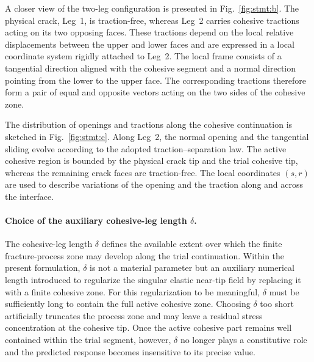 \documentclass[smallextended]{svjour3}       %
\begin{document}
A closer view of the two-leg configuration is presented in
Fig.~\ref{fig:stmt:b}. The physical crack, Leg~1, is traction-free, whereas
Leg~2 carries cohesive tractions acting on its two opposing faces. These
tractions depend on the local relative displacements between the upper and
lower faces and are expressed in a local coordinate system rigidly attached
to Leg~2. The local frame consists of a tangential direction aligned with the
cohesive segment and a normal direction pointing from the lower to the upper
face. The corresponding tractions therefore form a pair of equal and opposite
vectors acting on the two sides of the cohesive zone.

The distribution of openings and tractions along the cohesive continuation is
sketched in Fig.~\ref{fig:stmt:c}. Along Leg~2, the normal opening and the
tangential sliding evolve according to the adopted traction--separation law.
The active cohesive region is bounded by the physical crack tip and the trial
cohesive tip, whereas the remaining crack faces are traction-free. The local
coordinates $(s,r)$ are used to describe variations of the opening and the
traction along and across the interface.

\paragraph{Choice of the auxiliary cohesive-leg length \texorpdfstring{$\delta$}{delta}.}
The cohesive-leg length $\delta$ defines the available extent over which the
finite fracture-process zone may develop along the trial continuation. Within
the present formulation, $\delta$ is not a material parameter but an
auxiliary numerical length introduced to regularize the singular elastic
near-tip field by replacing it with a finite cohesive zone. For this
regularization to be meaningful, $\delta$ must be sufficiently long to
contain the full active cohesive zone. Choosing $\delta$ too short
artificially truncates the process zone and may leave a residual stress
concentration at the cohesive tip. Once the active cohesive part remains well
contained within the trial segment, however, $\delta$ no longer plays a
constitutive role and the predicted response becomes insensitive to its
precise value.
\end{document}
